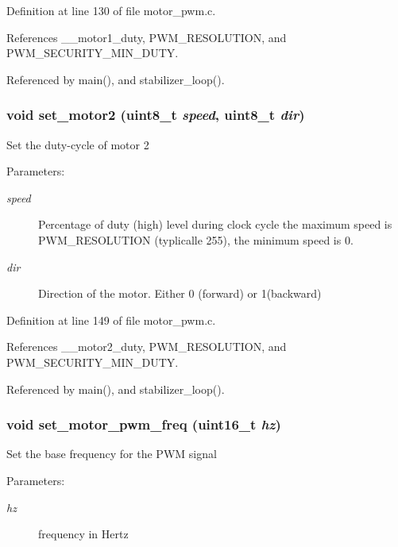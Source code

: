 Definition at line 130 of file motor\_\-pwm.c.

References \_\-\_\-motor1\_\-duty, PWM\_\-RESOLUTION, and PWM\_\-SECURITY\_\-MIN\_\-DUTY.

Referenced by main(), and stabilizer\_\-loop().
\subsubsection{\setlength{\rightskip}{0pt plus 5cm}void set\_\-motor2 (uint8\_\-t {\em speed}, uint8\_\-t {\em dir})\hspace{0.3cm}{\tt  [inline]}}\label{group__ro__motor__pwm_gc9b6d3d13b12f1b363f56ec624e5a7c3}


Set the duty-cycle of motor 2 \begin{Desc}
\item[Parameters:]
\begin{description}
\item[{\em speed}]Percentage of duty (high) level during clock cycle the maximum speed is PWM\_\-RESOLUTION (typlicalle 255), the minimum speed is 0. \item[{\em dir}]Direction of the motor. Either 0 (forward) or 1(backward) \end{description}
\end{Desc}


Definition at line 149 of file motor\_\-pwm.c.

References \_\-\_\-motor2\_\-duty, PWM\_\-RESOLUTION, and PWM\_\-SECURITY\_\-MIN\_\-DUTY.

Referenced by main(), and stabilizer\_\-loop().
\subsubsection{\setlength{\rightskip}{0pt plus 5cm}void set\_\-motor\_\-pwm\_\-freq (uint16\_\-t {\em hz})}\label{group__ro__motor__pwm_g10ea3668355af957bfcc30641c8bfb3e}


Set the base frequency for the PWM signal \begin{Desc}
\item[Parameters:]
\begin{description}
\item[{\em hz}]frequency in Hertz \end{description}
\end{Desc}


